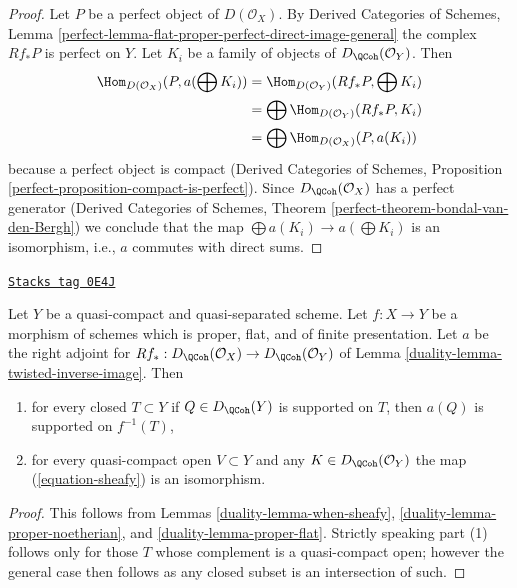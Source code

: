 \begin{proof}
Let $P$ be a perfect object of $D(\mathcal{O}_X)$. By
Derived Categories of Schemes, Lemma
\ref{perfect-lemma-flat-proper-perfect-direct-image-general}
the complex $Rf_*P$ is perfect on $Y$.
Let $K_i$ be a family of objects of $D_\QCoh(\mathcal{O}_Y)$.
Then
\begin{align*}
\Hom_{D(\mathcal{O}_X)}(P, a(\bigoplus K_i))
& =
\Hom_{D(\mathcal{O}_Y)}(Rf_*P, \bigoplus K_i) \\
& =
\bigoplus \Hom_{D(\mathcal{O}_Y)}(Rf_*P, K_i) \\
& =
\bigoplus \Hom_{D(\mathcal{O}_X)}(P, a(K_i))
\end{align*}
because a perfect object is compact (Derived Categories of Schemes,
Proposition \ref{perfect-proposition-compact-is-perfect}).
Since $D_\QCoh(\mathcal{O}_X)$ has a perfect generator
(Derived Categories of Schemes, Theorem
\ref{perfect-theorem-bondal-van-den-Bergh})
we conclude that the map $\bigoplus a(K_i) \to a(\bigoplus K_i)$
is an isomorphism, i.e., $a$ commutes with direct sums.
\end{proof}

\begin{lemma}
\label{duality-lemma-proper-flat-relative}
\href{https://stacks.math.columbia.edu/tag/0E4J}{\texttt{Stacks tag 0E4J}}

Let $Y$ be a quasi-compact and quasi-separated scheme.
Let $f : X \to Y$ be a morphism of schemes which is proper, flat, and
of finite presentation.
Let $a$ be the right adjoint for
$Rf_* : D_\QCoh(\mathcal{O}_X) \to D_\QCoh(\mathcal{O}_Y)$ of
Lemma \ref{duality-lemma-twisted-inverse-image}. Then
\begin{enumerate}
\item for every closed $T \subset Y$ if $Q \in D_\QCoh(Y)$ is supported on $T$,
then $a(Q)$ is supported on $f^{-1}(T)$,
\item for every quasi-compact open $V \subset Y$ and any
$K \in D_\QCoh(\mathcal{O}_Y)$ the map (\ref{equation-sheafy})
is an isomorphism.
\end{enumerate}
\end{lemma}

\begin{proof}

This follows from Lemmas \ref{duality-lemma-when-sheafy},
\ref{duality-lemma-proper-noetherian}, and
\ref{duality-lemma-proper-flat}. Strictly speaking part (1) follows
only for those $T$ whose complement is a quasi-compact open;
however the general case then follows as any closed subset is an
intersection of such.
\end{proof}

